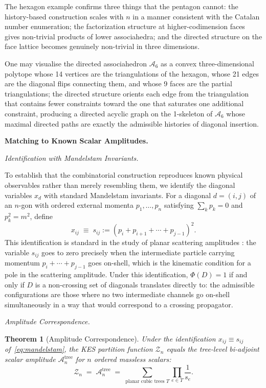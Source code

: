 \documentclass[11pt]{article}
\theoremstyle{plain}
\newtheorem{theorem}{Theorem}[section]
\theoremstyle{definition}
\theoremstyle{remark}
\newcommand{\Phif}{\Phi}
\begin{document}
The hexagon example confirms three things that the pentagon cannot: the history-based construction scales with $n$ in a manner consistent with the Catalan number enumeration; the factorization structure at higher-codimension faces gives non-trivial products of lower associahedra; and the directed structure on the face lattice becomes genuinely non-trivial in three dimensions.

One may visualise the directed associahedron $\mathcal{A}_6$ as a convex three-dimensional polytope whose 14 vertices are the triangulations of the hexagon, whose 21 edges are the diagonal flips connecting them, and whose 9 faces are the partial triangulations; the directed structure orients each edge from the triangulation that contains fewer constraints toward the one that saturates one additional constraint, producing a directed acyclic graph on the 1-skeleton of $\mathcal{A}_6$ whose maximal directed paths are exactly the admissible histories of diagonal insertion.

\bigskip\noindent\textbf{Matching to Known Scalar Amplitudes.}
\label{sec:matching}

\medskip\noindent\textit{Identification with Mandelstam Invariants.}

To establish that the combinatorial construction reproduces known physical
observables rather than merely resembling them, we identify the diagonal
variables $x_d$ with standard Mandelstam invariants. For a diagonal
$d = (i,j)$ of an $n$-gon with ordered external momenta
$p_1, \ldots, p_n$ satisfying $\sum_k p_k = 0$ and $p_k^2 = m^2$,
define
\begin{equation}
\label{eq:mandelstam}
  x_{ij} \;\equiv\; s_{ij} := (p_i + p_{i+1} + \cdots + p_{j-1})^2.
\end{equation}
This identification is standard in the study of planar scattering amplitudes
\cite{ABHY2018}: the variable $s_{ij}$ goes to zero precisely when the
intermediate particle carrying momentum $p_i + \cdots + p_{j-1}$ goes
on-shell, which is the kinematic condition for a pole in the scattering
amplitude. Under this identification, $\Phif(D) = 1$ if and only if $D$ is
a non-crossing set of diagonals translates directly to: the admissible
configurations are those where no two intermediate channels go on-shell
simultaneously in a way that would correspond to a crossing propagator.

\medskip\noindent\textit{Amplitude Correspondence.}

\begin{theorem}[Amplitude Correspondence]
\label{thm:amplitude}
Under the identification $x_{ij} \equiv s_{ij}$ of~\eqref{eq:mandelstam},
the KES partition function $\mathcal{Z}_n$ equals the
tree-level bi-adjoint scalar amplitude $\mathcal{A}_n^{\mathrm{tree}}$
for $n$ ordered massless scalars:
\[
  \mathcal{Z}_n \;=\; \mathcal{A}_n^{\mathrm{tree}}
  \;=\; \sum_{\text{planar cubic trees } T}
  \prod_{e \in T} \frac{1}{s_e}.
\]
\end{theorem}
\end{document}
